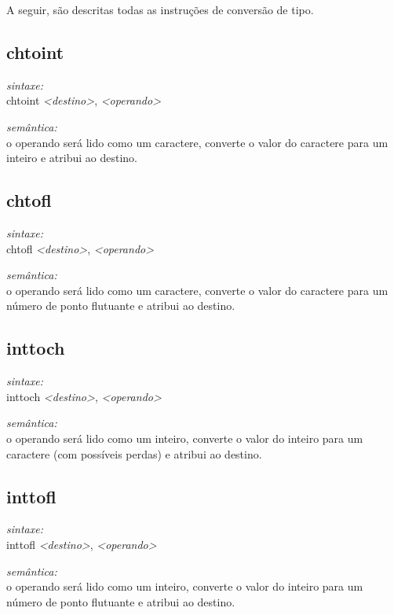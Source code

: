 \documentclass[12pt,a4paper,extrafontsizes,article]{memoir}
\newcommand*{\srcfont}{\fontfamily{pcr}\selectfont}
\begin{document}
A seguir, são descritas todas as instruções de conversão de tipo.


\subsection{\textbf{chtoint}}

\textit{sintaxe:}\\{\srcfont chtoint \textit{<destino>}, \textit{<operando>}}

\noindent \textit{semântica:}\\o operando será lido como um caractere, converte o valor do caractere para um inteiro e atribui ao destino.


\subsection{\textbf{chtofl}}

\textit{sintaxe:}\\{\srcfont chtofl \textit{<destino>}, \textit{<operando>}}

\noindent \textit{semântica:}\\o operando será lido como um caractere, converte o valor do caractere para um número de ponto flutuante e
atribui ao destino.


\subsection{\textbf{inttoch}}

\textit{sintaxe:}\\{\srcfont inttoch \textit{<destino>}, \textit{<operando>}}

\noindent \textit{semântica:}\\o operando será lido como um inteiro, converte o valor do inteiro para um caractere (com possíveis perdas) e
atribui ao destino.


\subsection{\textbf{inttofl}}

\textit{sintaxe:}\\{\srcfont inttofl \textit{<destino>}, \textit{<operando>}}

\noindent \textit{semântica:}\\o operando será lido como um inteiro, converte o valor do inteiro para um número de ponto flutuante e atribui
ao destino.
\end{document}
